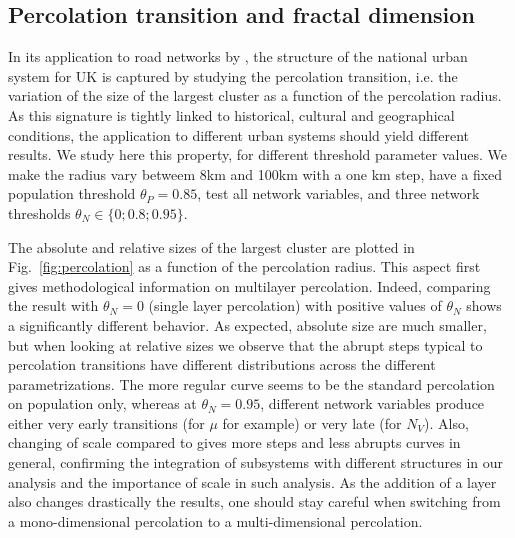 \documentclass{jimis-en}
\begin{document}
\subsection{Percolation transition and fractal dimension}



In its application to road networks by \cite{arcaute2016cities}, the structure of the national urban system for UK is captured by studying the percolation transition, i.e. the variation of the size of the largest cluster as a function of the percolation radius. As this signature is tightly linked to historical, cultural and geographical conditions, the application to different urban systems should yield different results. We study here this property, for different threshold parameter values. We make the radius vary betweem 8km and 100km with a one km step, have a fixed population threshold $\theta_P = 0.85$, test all network variables, and three network thresholds $\theta_N \in \{ 0 ; 0.8 ; 0.95 \}$.

The absolute and relative sizes of the largest cluster are plotted in Fig.~\ref{fig:percolation} as a function of the percolation radius. This aspect first gives methodological information on multilayer percolation. Indeed, comparing the result with $\theta_N = 0$ (single layer percolation) with positive values of $\theta_N$ shows a significantly different behavior. As expected, absolute size are much smaller, but when looking at relative sizes we observe that the abrupt steps typical to percolation transitions have different distributions across the different parametrizations. The more regular curve seems to be the standard percolation on population only, whereas at $\theta_N = 0.95$, different network variables produce either very early transitions (for $\mu$ for example) or very late (for $N_V$). Also, changing of scale compared to \cite{arcaute2016cities} gives more steps and less abrupts curves in general, confirming the integration of subsystems with different structures in our analysis and the importance of scale in such analysis. As the addition of a layer also changes drastically the results, one should stay careful when switching from a mono-dimensional percolation to a multi-dimensional percolation.
\end{document}
